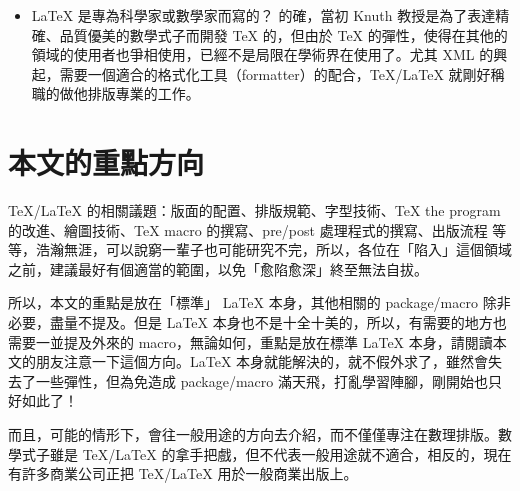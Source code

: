 \begin{itemize}
  \item \LaTeX{} 是專為科學家或數學家而寫的？ \newline
  的確，當初 Knuth 教授是為了表達精確、品質優美的數學式子而開發 \TeX{} 的，但由於 \TeX{} 的彈性，使得在其他的領域的使用者也爭相使用，已經不是局限在學術界在使用了。尤其 XML 的興起，需要一個適合的格式化工具（formatter）的配合，\TeX/\LaTeX{} 就剛好稱職的做他排版專業的工作。

\end{itemize}

\section{本文的重點方向}

\TeX{}/\LaTeX{} 的相關議題：版面的配置、排版規範、字型技術、\TeX{} the program 的改進、繪圖技術、\TeX{} macro 的撰寫、pre/post 處理程式的撰寫、出版流程 \chdots{} 等等，浩瀚無涯，可以說窮一輩子也可能研究不完，所以，各位在「陷入」這個領域之前，建議最好有個適當的範圍，以免「愈陷愈深」終至無法自拔。

所以，本文的重點是放在「標準」 \LaTeX{} 本身，其他相關的 package/macro 除非必要，盡量不提及。但是 \LaTeX{} 本身也不是十全十美的，所以，有需要的地方也需要一並提及外來的 macro，無論如何，重點是放在標準 \LaTeX{} 本身，請閱讀本文的朋友注意一下這個方向。\LaTeX{} 本身就能解決的，就不假外求了，雖然會失去了一些彈性，但為免造成 package/macro 滿天飛，打亂學習陣腳，剛開始也只好如此了！

而且，可能的情形下，會往一般用途的方向去介紹，而不僅僅專注在數理排版。數學式子雖是 \TeX{}/\LaTeX{} 的拿手把戲，但不代表一般用途就不適合，相反的，現在有許多商業公司正把 \TeX{}/\LaTeX{} 用於一般商業出版上。

